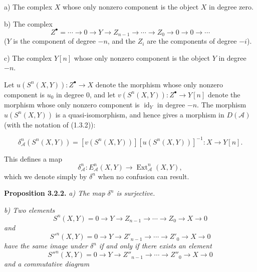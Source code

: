 \clearpage
{}%
\begingroup\small\setlength{\parskip}{0pt}\setlength{\emergencystretch}{1.5em}
\setlength{\abovedisplayskip}{4pt plus 2pt minus 2pt}%
\setlength{\belowdisplayskip}{4pt plus 2pt minus 2pt}%

\noindent a) The complex $X$ whose only nonzero component is the object $X$
in degree zero.

\noindent b) The complex
\[
Z^\bullet=\cdots\longrightarrow0\longrightarrow Y
\longrightarrow Z_{n-1}\longrightarrow\cdots\longrightarrow Z_0
\longrightarrow0\longrightarrow0\longrightarrow\cdots
\]
($Y$ is the component of degree $-n$, and the $Z_i$ are the components of
degree $-i$).

\noindent c) The complex $Y[n]$ whose only nonzero component is the object
$Y$ in degree $-n$.

Let $u(S^n(X,Y))\colon Z^\bullet\longrightarrow X$ denote the morphism whose
only nonzero component is $u_0$ in degree $0$, and let
$v(S^n(X,Y))\colon Z^\bullet\longrightarrow Y[n]$ denote the morphism whose
only nonzero component is $\operatorname{id}_Y$ in degree $-n$. The morphism
$u(S^n(X,Y))$ is a quasi-isomorphism, and hence gives a morphism in
$D(\mathcal A)$ (with the notation of (1.3.2)):

\begin{equation}
\delta_{\mathcal A}^{n}(S^n(X,Y))=
[v(S^n(X,Y))][u(S^n(X,Y))]^{-1}\colon X\longrightarrow Y[n].
\tag{3.2.1.1}
\end{equation}

This defines a map
\begin{equation}
\delta_{\mathcal A}^{n}\colon E_{\mathcal A}^{n}(X,Y)
\longrightarrow\operatorname{Ext}_{\mathcal A}^{n}(X,Y),
\tag{3.2.1.2}
\end{equation}
which we denote simply by $\delta^n$ when no confusion can result.

\medskip\noindent\textbf{Proposition 3.2.2.}\quad
\textit{a) The map $\delta^n$ is surjective.}

\noindent\textit{b) Two elements}
\[
S^n(X,Y)=0\longrightarrow Y\longrightarrow Z_{n-1}
\longrightarrow\cdots\longrightarrow Z_0\longrightarrow X
\longrightarrow0
\]
\noindent\textit{and}
\[
{S'}^n(X,Y)=0\longrightarrow Y\longrightarrow Z'_{n-1}
\longrightarrow\cdots\longrightarrow Z'_0\longrightarrow X
\longrightarrow0
\]
\noindent\textit{have the same image under $\delta^n$ if and only if there
exists an element}
\[
{S''}^n(X,Y)=0\longrightarrow Y\longrightarrow Z''_{n-1}
\longrightarrow\cdots\longrightarrow Z''_0\longrightarrow X
\longrightarrow0
\]
\noindent\textit{and a commutative diagram}

